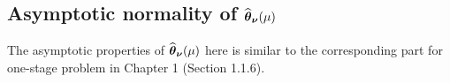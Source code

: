 \subsection{Asymptotic normality of $\widehat{\boldsymbol{\theta}}_{\boldsymbol{\nu}}(\mu)$}
The asymptotic properties of $\widehat{\boldsymbol{\theta}}_{\boldsymbol{\nu}}(\mu)$ here is similar to the corresponding part for one-stage problem in Chapter 1 (Section 1.1.6). 
